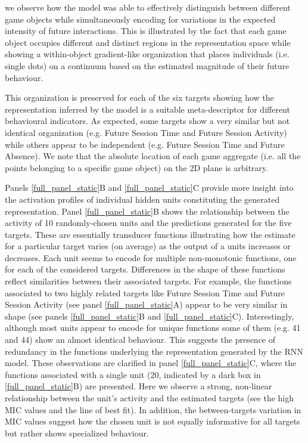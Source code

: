 we observe how the model was able to effectively distinguish between different game objects while simultaneously encoding for variations in the expected intensity of future interactions. This is illustrated by the fact that each game object occupies different and distinct regions in the representation space while showing a within-object gradient-like organization that places individuals (i.e. single dots) on a continuum based on the estimated magnitude of their future behaviour. 

This organization is preserved for each of the six targets showing how the representation inferred by the model is a suitable meta-descriptor for different behavioural indicators. As expected, some targets show a very similar but not identical organization (e.g. Future Session Time and Future Session Activity) while others appear to be independent (e.g. Future Session Time and Future Absence). We note that the absolute location of each game aggregate (i.e. all the points belonging to a specific game object) on the 2D plane is arbitrary. 

Panels \ref{full_panel_static}B and \ref{full_panel_static}C provide more insight into the activation profiles of individual hidden units constituting the generated representation. Panel \ref{full_panel_static}B shows the relationship between the activity of 10 randomly-chosen units and the predictions generated for the five targets. These are essentially transducer functions illustrating how the estimate for a particular target varies (on average) as the output of a units increases or decreases. Each unit seems to encode for multiple non-monotonic functions, one for each of the considered targets. Differences in the shape of these functions reflect similarities between their associated targets. For example, the functions associated to two highly related targets like Future Session Time and Future Session Activity (see panel \ref{full_panel_static}A) appear to be very similar in shape (see panels \ref{full_panel_static}B and \ref{full_panel_static}C). Interestingly, although most units appear to encode for unique functions some of them (e.g. 41 and 44) show an almost identical behaviour. This suggests the presence of redundancy in the functions underlying the representation generated by the RNN model. These observations are clarified in panel \ref{full_panel_static}C, where the functions associated with a single unit (20, indicated by a dark box in \ref{full_panel_static}B) are presented. Here we observe a strong, non-linear relationship between the unit's activity and the estimated targets (see the high MIC values and the line of best fit). In addition, the between-targets variation in MIC values suggest how the chosen unit is not equally informative for all targets but rather shows specialized  behaviour.

